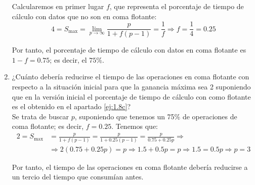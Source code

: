 \begin{ejercicio}
\begin{enumerate}
        Calcularemos en primer lugar $f$, que representa el porcentaje de tiempo de cálculo con datos que no son en coma flotante:
        \begin{equation*}
            4 = S_{\max} = \lim_{p\to\infty} \frac{p}{1+f(p-1)} = \frac{1}{f} \Longrightarrow f = \frac{1}{4} = 0.25
        \end{equation*}
        
        Por tanto, el porcentaje de tiempo de cálculo con datos en coma flotante es $1-f=0.75$; es decir, el $75\%$.

        \item ¿Cuánto debería reducirse el tiempo de las operaciones en coma flotante con respecto a la situación
        inicial para que la ganancia máxima sea 2 suponiendo que en la versión inicial el porcentaje de tiempo de
        cálculo con como flotante es el obtenido en el apartado \ref{ej:1.8c}?\\

        Se trata de buscar $p$, suponiendo que tenemos un 75\% de operaciones de coma flotante; es decir, $f=0.25$. Tenemos que:
        \begin{align*}
            2 = S_{\max} &= \frac{p}{1+f(p-1)} = \frac{p}{1+0.25(p-1)} = \frac{p}{0.75+0.25p} \Longrightarrow \\
            &\Longrightarrow 2(0.75+0.25p) = p \Longrightarrow 1.5+0.5p = p \Longrightarrow 1.5 = 0.5p \Longrightarrow p = 3
        \end{align*}

        Por tanto, el tiempo de las operaciones en coma flotante debería reducirse a un tercio del tiempo que consumían antes.

    \end{enumerate}
\end{ejercicio}

